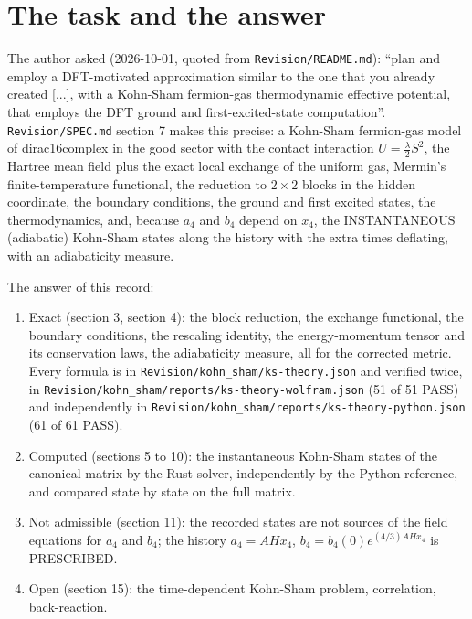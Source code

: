 \documentclass[11pt]{article}
\begin{document}
\begin{abstract}
recorded Kohn-Sham state satisfies the source conditions of the $a_4$ and $b_4$ equations, so the history is a prescribed background without back-reaction. Not done: the time-dependent (non-adiabatic) Kohn-Sham problem, correlation beyond exchange, back-reaction.

\end{abstract}

\section{The task and the answer}

The author asked (2026-10-01, quoted from \texttt{Revision\allowbreak{}/README.\allowbreak{}md}): ``plan and employ a DFT-motivated approximation similar to the one that you already created [...], with a Kohn-Sham fermion-gas thermodynamic effective potential, that employs the DFT ground and first-excited-state computation''. \texttt{Revision\allowbreak{}/SPEC.md} section 7 makes this precise: a Kohn-Sham fermion-gas model of dirac16complex in the good sector with the contact interaction $U = \frac{\lambda}{2}S^2$, the Hartree mean field plus the exact local exchange of the uniform gas, Mermin's finite-temperature functional, the reduction to $2 \times 2$ blocks in the hidden coordinate, the boundary conditions, the ground and first excited states, the thermodynamics, and, because $a_4$ and $b_4$ depend on $x_4$, the INSTANTANEOUS (adiabatic) Kohn-Sham states along the history with the extra times deflating, with an adiabaticity measure.

The answer of this record:

\begin{enumerate}
\item Exact (section 3, section 4): the block reduction, the exchange functional, the boundary conditions, the rescaling identity, the energy-momentum tensor and its conservation laws, the adiabaticity measure, all for the corrected metric. Every formula is in \texttt{Revision\allowbreak{}/kohn\_sh\allowbreak{}am/ks-th\allowbreak{}eory.jso\allowbreak{}n} and verified twice, in \texttt{Revision\allowbreak{}/kohn\_sh\allowbreak{}am/repor\allowbreak{}ts/ks-th\allowbreak{}eory-wol\allowbreak{}fram.jso\allowbreak{}n} (51 of 51 PASS) and independently in \texttt{Revision\allowbreak{}/kohn\_sh\allowbreak{}am/repor\allowbreak{}ts/ks-th\allowbreak{}eory-pyt\allowbreak{}hon.json} (61 of 61 PASS).
\item Computed (sections 5 to 10): the instantaneous Kohn-Sham states of the canonical matrix by the Rust solver, independently by the Python reference, and compared state by state on the full matrix.
\item Not admissible (section 11): the recorded states are not sources of the field equations for $a_4$ and $b_4$; the history $a_4 = AHx_4$, $b_4 = b_4(0)e^{(4/3)AHx_4}$ is PRESCRIBED.
\item Open (section 15): the time-dependent Kohn-Sham problem, correlation, back-reaction.
\end{enumerate}
\end{document}

